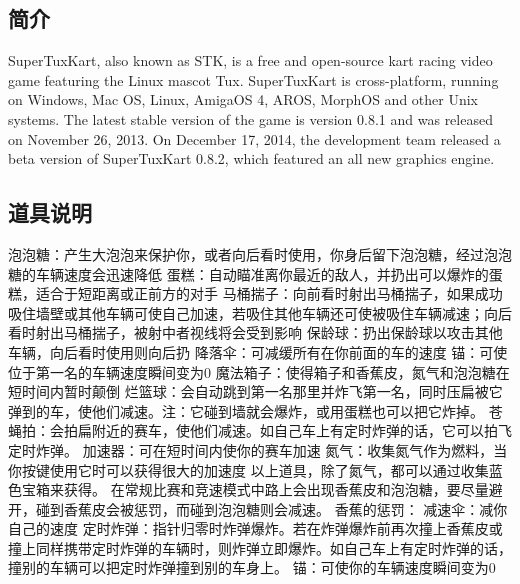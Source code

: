 \documentclass[paper=a4,fontsize=11pt]{article}
\begin{document}
	\subsection{简介}
	
	SuperTuxKart, also known as STK, is a free and open-source kart racing video game featuring the Linux mascot Tux. SuperTuxKart is cross-platform, running on Windows, Mac OS, Linux, AmigaOS 4, AROS, MorphOS and other Unix systems. The latest stable version of the game is version 0.8.1 and was released on November 26, 2013. On December 17, 2014, the development team released a beta version of SuperTuxKart 0.8.2, which featured an all new graphics engine.
	
	\subsection{道具说明}
	
	\noindent 泡泡糖：产生大泡泡来保护你，或者向后看时使用，你身后留下泡泡糖，经过泡泡糖的车辆速度会迅速降低\newline
	蛋糕：自动瞄准离你最近的敌人，并扔出可以爆炸的蛋糕，适合于短距离或正前方的对手\newline
	马桶揣子：向前看时射出马桶揣子，如果成功吸住墙壁或其他车辆可使自己加速，若吸住其他车辆还可使被吸住车辆减速；向后看时射出马桶揣子，被射中者视线将会受到影响\newline
	保龄球：扔出保龄球以攻击其他车辆，向后看时使用则向后扔\newline
	降落伞：可减缓所有在你前面的车的速度\newline
	锚：可使位于第一名的车辆速度瞬间变为0\newline
	魔法箱子：使得箱子和香蕉皮，氮气和泡泡糖在短时间内暂时颠倒\newline
	烂篮球：会自动跳到第一名那里并炸飞第一名，同时压扁被它弹到的车，使他们减速。注：它碰到墙就会爆炸，或用蛋糕也可以把它炸掉。\newline
	苍蝇拍：会拍扁附近的赛车，使他们减速。如自己车上有定时炸弹的话，它可以拍飞定时炸弹。\newline
	加速器：可在短时间内使你的赛车加速\newline
	氮气：收集氮气作为燃料，当你按键使用它时可以获得很大的加速度\newline
	以上道具，除了氮气，都可以通过收集蓝色宝箱来获得。\newline
	在常规比赛和竞速模式中路上会出现香蕉皮和泡泡糖，要尽量避开，碰到香蕉皮会被惩罚，而碰到泡泡糖则会减速。\newline
	香蕉的惩罚：\newline
	减速伞：减你自己的速度\newline
	定时炸弹：指针归零时炸弹爆炸。若在炸弹爆炸前再次撞上香蕉皮或撞上同样携带定时炸弹的车辆时，则炸弹立即爆炸。如自己车上有定时炸弹的话，撞别的车辆可以把定时炸弹撞到别的车身上。\newline
	锚：可使你的车辆速度瞬间变为0
	
\end{document}
